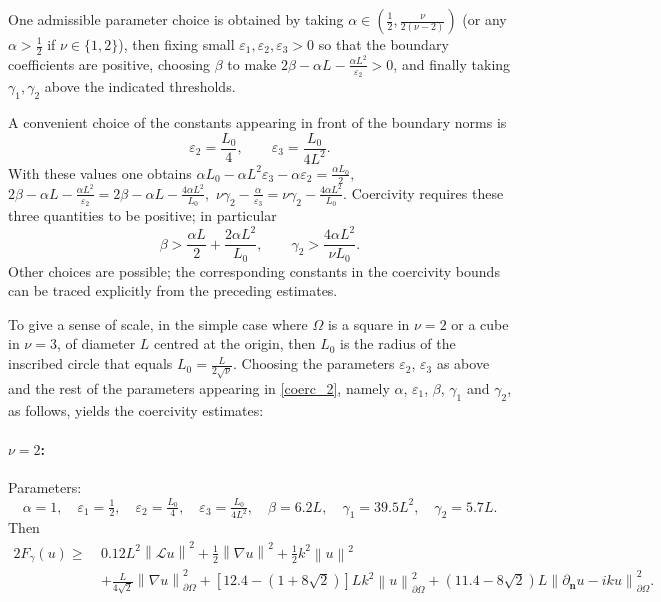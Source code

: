 \documentclass[twoside,11pt]{article}
\def\dimx{\nu }
\def\L{{\mathscr{L}}}
\newcommand{\Norm}[1]{\ensuremath{\left\|#1\right\|}}
\def\L{{\mathscr{L}}}
\begin{document}
{{One admissible parameter choice is obtained by taking $\alpha\in(\tfrac12,\frac{\dimx}{2(\dimx-2)})$ (or any $\alpha>\tfrac12$ if $\dimx\in\{1,2\}$), then fixing small $\varepsilon_1,\varepsilon_2,\varepsilon_3>0$ so that the boundary coefficients are positive, choosing $\beta$ to make $2\beta-\alpha L - \frac{\alpha L^2}{\varepsilon_2}>0$, and finally taking $\gamma_1,\gamma_2$ above the indicated thresholds.}


\begin{remark}
 A {  convenient} choice of the constants {  appearing} in front of the boundary norms is  
\[
   \varepsilon_2=\frac{L_0}{4}, \qquad \varepsilon_3=\frac{L_0}{4L^2}.
   \]
   With these values one obtains $\alpha L_0 - \alpha L^2
     \varepsilon_3 - \alpha \varepsilon_2 = \frac{\alpha L_0}{2}, $ $2
     \beta - \alpha L - \frac {\alpha L^2 } {\varepsilon_2} = 2 \beta
     - \alpha L - \frac{4 \alpha L^2}{L_0},$ $\dimx
     \gamma_2-\frac{\alpha}{\varepsilon_3} = \dimx \gamma_2- \frac{4
       \alpha L^2}{L_0} .$ { Coercivity requires these three
       quantities to be positive; in particular
\[
   \beta > \frac{\alpha L}{2} + \frac{2\alpha L^2}{L_0}, \qquad \gamma_2  >  \frac{4 \alpha L^2}{\dimx L_0}.
\]
}
Other choices are possible; the {  corresponding} constants in the coercivity bounds can be traced explicitly from the preceding estimates.
\end{remark}
\begin{remark}
\label{remark_square}
{  To give a sense of scale,  in the simple case where $\Omega$ is a square in $\dimx = 2$  or a cube in $\dimx = 3$, of diameter $L$ centred at the 
origin, then $L_0$ is the radius of the inscribed circle that equals  $L_0 = \frac{L}{2\sqrt{\dimx}}$. Choosing the parameters 
$\varepsilon_2$, $\varepsilon_3$ as above and the rest of the parameters appearing in \eqref{coerc_2}, namely
$\alpha$, $\varepsilon_1$, $\beta$, $\gamma_1$ and $\gamma_2$, as follows,
yields the coercivity estimates:

\paragraph{$\dimx = 2$:} Parameters:
\[
   \alpha = 1, \quad \varepsilon_1 = \tfrac{1}{2}, \quad
   \varepsilon_2 = \tfrac{L_0}{4}, \quad
   \varepsilon_3 = \tfrac{L_0}{4L^2}, \quad
   \beta = 6.2 L, \quad
   \gamma_1 = 39.5 L^2, \quad
   \gamma_2 = 5.7 L.
\]
Then
\begin{align*}
  2 F_{\gamma} (u) \ge\ & 0.12 L^2 \Norm{\L  u}^2 + \frac{1}{2}\Norm{\nabla u}^2 + \frac{1}{2}k^2 \Norm{u}^2 \\
   & + \frac{L}{4\sqrt{2}} \Norm{\nabla u}_{\partial \Omega}^2 + [12.4 - (1 + 8\sqrt{2})] L k^2 \Norm{u}_{\partial \Omega}^2
      +  (11.4 - 8\sqrt{2})L \Norm{\partial_{\mathbf n}u - iku}^{2}_{\partial\Omega} .
\end{align*}

}
\end{remark}}
\end{document}
